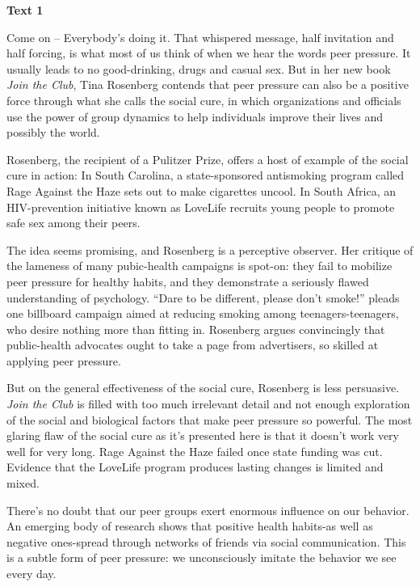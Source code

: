 
\begin{center}\textbf{Text 1}\end{center}

\qquad Come on -- Everybody's doing it. That whispered message, half invitation and half forcing, is what most of us think of when we hear the words peer pressure. It usually leads to no good-drinking, drugs and casual sex. 
But in her new book \emph{Join the Club}, Tina Rosenberg contends that peer pressure 
can also be a positive force through what she calls the social cure, in which organizations and officials use the power of group dynamics to help individuals improve their lives and possibly the world.

\qquad Rosenberg, the recipient of a Pulitzer Prize, offers a host of example of the social cure in action: In South Carolina, a state-sponsored antismoking program called Rage Against the Haze sets out to make cigarettes uncool. In South Africa, an HIV-prevention initiative known as LoveLife recruits young people to promote safe sex among their peers.

\qquad The idea seems promising, and Rosenberg is a perceptive observer. Her critique of the lameness of many pubic-health campaigns is spot-on: they fail to mobilize peer pressure for healthy habits, and they demonstrate a seriously flawed understanding of psychology. ``Dare to be different, please don't smoke!'' pleads one billboard campaign aimed at reducing smoking among teenagers-teenagers, who desire nothing more than fitting in. Rosenberg argues convincingly that public-health advocates ought to take a page from advertisers, so skilled at applying peer pressure.

\qquad But on the general effectiveness of the social cure, Rosenberg is less persuasive. \emph{Join the Club} is filled with too much irrelevant detail and not enough exploration of the social and biological factors that make peer pressure so powerful. The most glaring flaw of the social cure as it's presented here is that it doesn't work very well for very long. Rage Against the Haze failed once state funding was cut. Evidence that the LoveLife program produces lasting changes is limited and mixed.

\qquad There's no doubt that our peer groups exert enormous influence on our behavior. An emerging body of research shows that positive health habits-as well as negative ones-spread through networks of friends via social communication. This is a subtle form of peer pressure: we unconsciously imitate the behavior we see every day.

